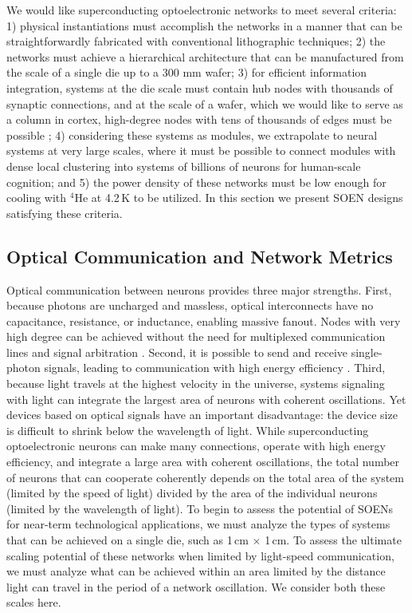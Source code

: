 \documentclass[twocolumn]{article}
\begin{document}
We would like superconducting optoelectronic networks to meet several criteria: 1) physical instantiations must accomplish the networks in a manner that can be straightforwardly fabricated with conventional lithographic techniques; 2) the networks must achieve a hierarchical architecture that can be manufactured from the scale of a single die up to a 300 mm wafer; 3) for efficient information integration, systems at the die scale must contain hub nodes with thousands of synaptic connections, and at the scale of a wafer, which we would like to serve as a column in cortex, high-degree nodes with tens of thousands of edges must be possible \cite{sh2018_ICRC}; 4) considering these systems as modules, we extrapolate to neural systems at very large scales, where it must be possible to connect modules with dense local clustering into systems of billions of neurons for human-scale cognition; and 5) the power density of these networks must be low enough for cooling with $^4$He at 4.2\,K to be utilized. In this section we present SOEN designs satisfying these criteria.
	
\subsection{\label{sec:opticalCommunicationAndGraphMetrics}Optical Communication and Network Metrics}
Optical communication between neurons provides three major strengths. First, because photons are uncharged and massless, optical interconnects have no capacitance, resistance, or inductance, enabling massive fanout. Nodes with very high degree can be achieved without the need for multiplexed communication lines and signal arbitration \cite{lide2015}. Second, it is possible to send and receive single-photon signals, leading to communication with high energy efficiency \cite{mave2013}. Third, because light travels at the highest velocity in the universe, systems signaling with light can integrate the largest area of neurons with coherent oscillations. Yet devices based on optical signals have an important disadvantage: the device size is difficult to shrink below the wavelength of light. While superconducting optoelectronic neurons can make many connections, operate with high energy efficiency, and integrate a large area with coherent oscillations, the total number of neurons that can cooperate coherently depends on the total area of the system (limited by the speed of light) divided by the area of the individual neurons (limited by the wavelength of light). To begin to assess the potential of SOENs for near-term technological applications, we must analyze the types of systems that can be achieved on a single die, such as 1\,cm $\times$ 1\,cm. To assess the ultimate scaling potential of these networks when limited by light-speed communication, we must analyze what can be achieved within an area limited by the distance light can travel in the period of a network oscillation. We consider both these scales here.
\end{document}

